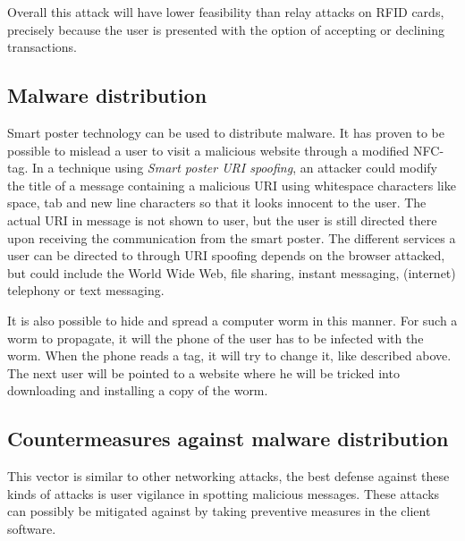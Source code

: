 Overall this attack will have lower feasibility than relay attacks on RFID cards, precisely because the user is presented with the option of accepting or declining transactions.




\subsection{Malware distribution}
Smart poster technology can be used to distribute malware.
It has proven to be possible to mislead a user to visit a malicious website through a modified NFC-tag.
In a technique using \textit{Smart poster URI spoofing}, an attacker could modify the title of a message containing a malicious URI using whitespace characters like space, tab and new line characters so that it looks innocent to the user.
The actual URI in message is not shown to user, but the user is still directed there upon receiving the communication from the smart poster.
The different services a user can be directed to through URI spoofing depends on the browser attacked, but could include the World Wide Web, file sharing, instant messaging, (internet) telephony or text messaging.

It is also possible to hide and spread a computer worm in this manner.
For such a worm to propagate, it will the phone of the user has to be infected with the worm.
When the phone reads a tag, it will try to change it, like described above.
The next user will be pointed to a website where he will be tricked into downloading and installing a copy of the worm.

\cite{mulliner2009vulnerability,rieback2006your} 

\subsection{Countermeasures against malware distribution}
This vector is similar to other networking attacks, the best defense against these kinds of attacks is user vigilance in spotting malicious messages.
These attacks can possibly be mitigated against by taking preventive measures in the client software.

